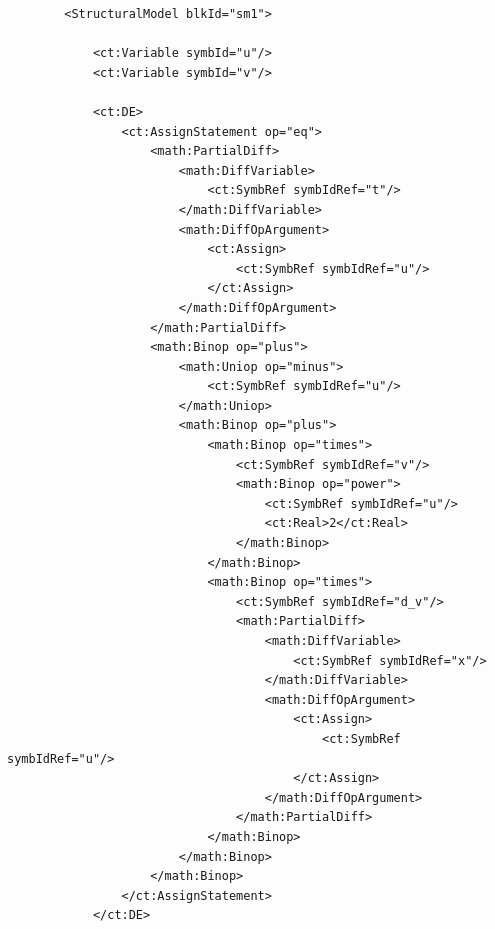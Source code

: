 \lstset{language=XML}
\begin{lstlisting}
        <StructuralModel blkId="sm1">
             
            <ct:Variable symbId="u"/>
            <ct:Variable symbId="v"/>
            
            <ct:DE>
                <ct:AssignStatement op="eq">
                    <math:PartialDiff>
                        <math:DiffVariable>
                            <ct:SymbRef symbIdRef="t"/>
                        </math:DiffVariable>
                        <math:DiffOpArgument>
                            <ct:Assign>
                                <ct:SymbRef symbIdRef="u"/>
                            </ct:Assign>
                        </math:DiffOpArgument>
                    </math:PartialDiff>
                    <math:Binop op="plus">
                        <math:Uniop op="minus">
                            <ct:SymbRef symbIdRef="u"/>
                        </math:Uniop>
                        <math:Binop op="plus">
                            <math:Binop op="times">
                                <ct:SymbRef symbIdRef="v"/>
                                <math:Binop op="power">
                                    <ct:SymbRef symbIdRef="u"/>
                                    <ct:Real>2</ct:Real>
                                </math:Binop>
                            </math:Binop>
                            <math:Binop op="times">
                                <ct:SymbRef symbIdRef="d_v"/>
                                <math:PartialDiff>
                                    <math:DiffVariable>
                                        <ct:SymbRef symbIdRef="x"/>
                                    </math:DiffVariable>
                                    <math:DiffOpArgument>
                                        <ct:Assign>
                                            <ct:SymbRef symbIdRef="u"/>
                                        </ct:Assign>
                                    </math:DiffOpArgument>
                                </math:PartialDiff>
                            </math:Binop>
                        </math:Binop>
                    </math:Binop>
                </ct:AssignStatement>
            </ct:DE>            
            

\end{lstlisting}
